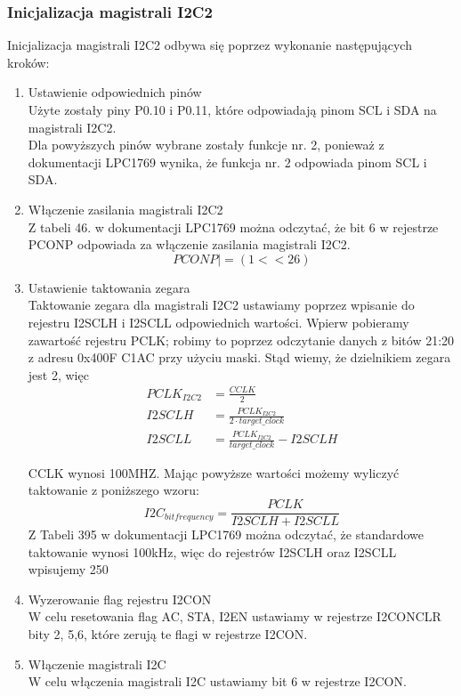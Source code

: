 \documentclass{article}
\begin{document}
\subsubsection{Inicjalizacja magistrali I2C2}
Inicjalizacja magistrali I2C2 odbywa się poprzez wykonanie następujących kroków:
\begin{enumerate}
    \item Ustawienie odpowiednich pinów\\
        Użyte zostały piny P0.10 i P0.11, które odpowiadają pinom SCL i SDA na magistrali I2C2.\\
        Dla powyższych pinów wybrane zostały funkcje nr. 2, ponieważ z dokumentacji LPC1769 wynika, że funkcja nr. 2 odpowiada pinom SCL i SDA.\\ %
    \item Włączenie zasilania magistrali I2C2\\
        Z tabeli 46. w dokumentacji LPC1769 można odczytać, że bit 6 w rejestrze PCONP odpowiada za włączenie zasilania magistrali I2C2.
        \[
            PCONP |= (1<<26)
        \]
    \item Ustawienie taktowania zegara\\
        Taktowanie zegara dla magistrali I2C2 ustawiamy poprzez wpisanie do rejestru I2SCLH i I2SCLL odpowiednich wartości. Wpierw pobieramy zawartość rejestru PCLK; robimy to poprzez odczytanie danych z bitów 21:20 z adresu 0x400F C1AC przy użyciu maski. Stąd wiemy, że dzielnikiem zegara jest 2, więc 
        \begin{align*}
        PCLK_{I2C2} &= \frac{CCLK}{2}\\
        I2SCLH &= \frac{PCLK_{I2C2}}{2 \cdot target\_clock}\\
        I2SCLL &= \frac{PCLK_{I2C2}}{target\_clock} - I2SCLH
        \end{align*}
            

        CCLK wynosi 100MHZ. Mając powyższe wartości możemy wyliczyć taktowanie z poniższego wzoru:
        \[
        I2C_{bitfrequency} = \frac{PCLK}{I2SCLH + I2SCLL}
        \]
        Z Tabeli 395 w dokumentacji LPC1769 można odczytać, że standardowe taktowanie wynosi 100kHz, więc do rejestrów I2SCLH oraz I2SCLL wpisujemy 250
    \item Wyzerowanie flag rejestru I2CON\\
        W celu resetowania flag AC, STA, I2EN ustawiamy w rejestrze I2CONCLR bity 2, 5,6, które zerują te flagi w rejestrze I2CON.
        
    \item Włączenie magistrali I2C\\
        W celu włączenia magistrali I2C ustawiamy bit 6 w rejestrze I2CON.
\end{enumerate}
\end{document}
